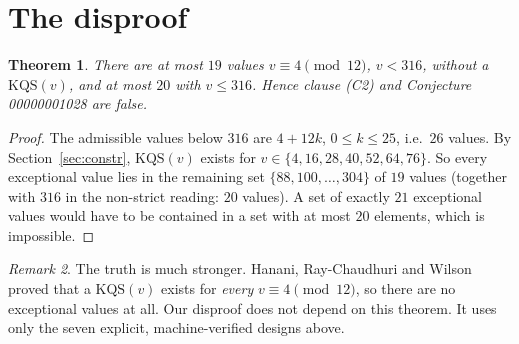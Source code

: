 \documentclass[11pt]{article}
\newtheorem{theorem}{Theorem}
\theoremstyle{definition}
\theoremstyle{remark}
\newtheorem{remark}[theorem]{Remark}
\begin{document}
\section{The disproof}
\begin{theorem}\label{thm:main}
There are at most $19$ values $v\equiv4\pmod{12}$, $v<316$, without a $\mathrm{KQS}(v)$, and
at most $20$ with $v\le316$. Hence clause (C2) and Conjecture 00000001028 are false.
\end{theorem}
\begin{proof}
The admissible values below $316$ are $4+12k$, $0\le k\le25$, i.e.\ $26$ values. By
Section~\ref{sec:constr}, $\mathrm{KQS}(v)$ exists for $v\in\{4,16,28,40,52,64,76\}$. So every
exceptional value lies in the remaining set
$\{88,100,\dots,304\}$ of $19$ values (together with $316$ in the non-strict reading: $20$
values). A set of exactly $21$ exceptional values would have to be contained in a set with at
most $20$ elements, which is impossible.
\end{proof}

\begin{remark}
The truth is much stronger. Hanani, Ray-Chaudhuri and Wilson \cite{hrw} proved that a
$\mathrm{KQS}(v)$ exists for \emph{every} $v\equiv4\pmod{12}$, so there are no exceptional
values at all. Our disproof does not depend on this theorem. It uses only the seven explicit,
machine-verified designs above.
\end{remark}
\end{document}
